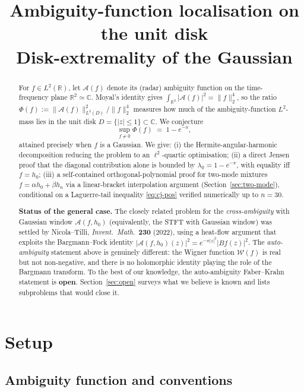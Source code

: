 \documentclass[11pt]{article}
\title{Ambiguity-function localisation on the unit disk\\
\large Disk-extremality of the Gaussian}
\author{}
\date{}
\theoremstyle{definition}
\newcommand{\C}{\mathbb{C}}
\newcommand{\R}{\mathbb{R}}
\newcommand{\Amb}{\mathcal{A}}
\newcommand{\Wig}{\mathcal{W}}
\newcommand{\norm}[1]{\lVert#1\rVert}
\begin{document}
\maketitle

\begin{abstract}
For $f\in L^{2}(\R)$, let $\Amb(f)$ denote its (radar) ambiguity function on the
time-frequency plane $\R^{2}\simeq\C$.  Moyal's identity gives
$\int_{\R^{2}}|\Amb(f)|^{2}=\norm{f}_{2}^{4}$, so the ratio
$\Phi(f):=\norm{\Amb(f)}_{L^{2}(D)}^{2}/\norm{f}_{2}^{4}$
measures how much of the ambiguity-function $L^{2}$-mass lies in the unit disk
$D=\{|z|\le 1\}\subset\C$.  We conjecture
\[
   \sup_{f\ne 0}\Phi(f) \;=\; 1-e^{-\pi},
\]
attained precisely when $f$ is a Gaussian.  We give:
(i) the Hermite-angular-harmonic decomposition reducing the problem to an
$\ell^{2}$-quartic optimisation; (ii) a direct Jensen proof that the
diagonal contribution alone is bounded by $\lambda_{0}=1-e^{-\pi}$, with
equality iff $f=h_{0}$; (iii) a self-contained orthogonal-polynomial
proof for two-mode mixtures $f=\alpha h_{0}+\beta h_{n}$ via a
linear-bracket interpolation argument \textup{(}Section~\ref{sec:two-mode}\textup{)},
conditional on a Laguerre-tail inequality \eqref{eq:cj-pos} verified
numerically up to $n=30$.

\smallskip
\textbf{Status of the general case.}  The closely related problem for the
\emph{cross-ambiguity} with Gaussian window
$\Amb(f,h_{0})$ \textup{(}equivalently, the STFT with Gaussian window\textup{)}
was settled by Nicola--Tilli, \emph{Invent.\ Math.}\ \textbf{230} \textup{(}2022\textup{)}, using a heat-flow
argument that exploits the Bargmann--Fock identity
$|\Amb(f,h_{0})(z)|^{2}=e^{-\pi|z|^{2}}|Bf(z)|^{2}$.  The
\emph{auto-ambiguity} statement above is genuinely different: the Wigner
function $\Wig(f)$ is real but not non-negative, and there is no
holomorphic identity playing the role of the Bargmann transform.  To the
best of our knowledge, the auto-ambiguity Faber--Krahn statement is
\textbf{open}.  Section~\ref{sec:open} surveys what we believe is known
and lists subproblems that would close it.
\end{abstract}

\section{Setup}

\subsection{Ambiguity function and conventions}
\end{document}
